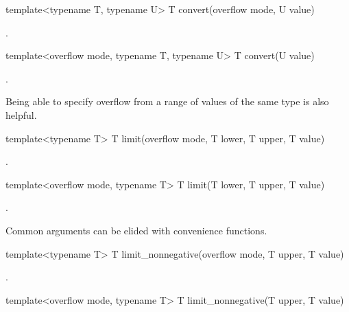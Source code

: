 \begin{addedblock}
\begin{itemdecl}
template<typename T, typename U> T convert(overflow mode, U value)		
\end{itemdecl}

\begin{itemdescr}
\returns {}.	
\end{itemdescr}

\begin{itemdecl}
template<overflow mode, typename T, typename U> T convert(U value)		
\end{itemdecl}

\begin{itemdescr}
\returns {}.	
\end{itemdescr}

Being able to specify overflow from a range of values of the same type is also helpful.

\begin{itemdecl}
template<typename T> T limit(overflow mode, T lower, T upper, T value)		
\end{itemdecl}

\begin{itemdescr}
\returns {}.	
\end{itemdescr}

\begin{itemdecl}
template<overflow mode, typename T> T limit(T lower, T upper, T value)		
\end{itemdecl}

\begin{itemdescr}
\returns {}.	
\end{itemdescr}

Common arguments can be elided with convenience functions.

\begin{itemdecl}
template<typename T> T limit_nonnegative(overflow mode, T upper, T value)		
\end{itemdecl}

\begin{itemdescr}
\returns {}.	
\end{itemdescr}

\begin{itemdecl}
template<overflow mode, typename T> T limit_nonnegative(T upper, T value)		
\end{itemdecl}


\end{addedblock}
